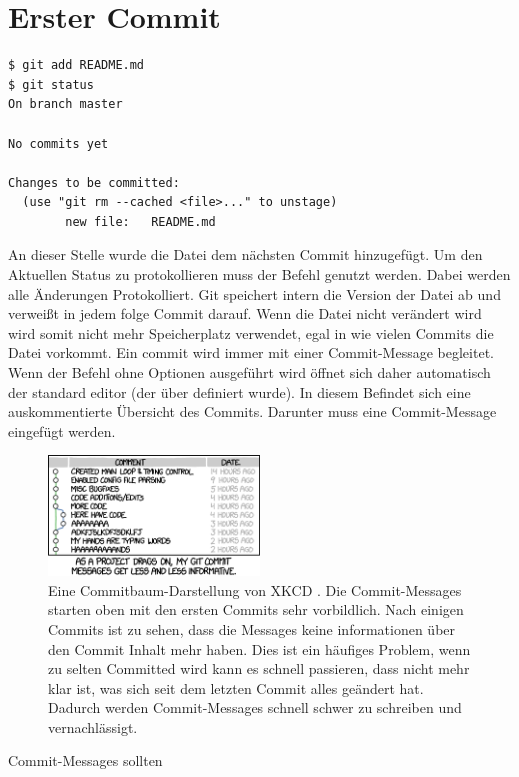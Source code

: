 \section{Erster Commit}
\begin{lstlisting}
$ git add README.md
$ git status
On branch master

No commits yet

Changes to be committed:
  (use "git rm --cached <file>..." to unstage)
        new file:   README.md
\end{lstlisting}
An dieser Stelle wurde die Datei
 dem nächsten Commit hinzugefügt. Um den Aktuellen Status zu protokollieren muss der Befehl  genutzt werden. Dabei werden alle Änderungen Protokolliert.
Git speichert intern die Version der Datei ab und verweißt in jedem folge Commit darauf. Wenn die Datei nicht verändert wird wird somit nicht mehr Speicherplatz verwendet, egal in wie vielen Commits die Datei vorkommt.
Ein commit wird immer mit einer Commit-Message begleitet. Wenn der Befehl  ohne Optionen ausgeführt wird öffnet sich daher automatisch der standard editor (der über  definiert wurde). In diesem Befindet sich eine auskommentierte Übersicht des Commits. Darunter muss eine Commit-Message eingefügt werden.
\begin{figure}[!h]
        \centering
        \includegraphics[width=0.5\textwidth]{Bilder/git_commit.png}
        \caption{Eine Commitbaum-Darstellung von XKCD \cite{Munroe}. Die Commit-Messages starten oben mit den ersten Commits sehr vorbildlich. Nach einigen Commits ist zu sehen, dass die Messages keine informationen über den Commit Inhalt mehr haben. Dies ist ein häufiges Problem, wenn zu selten Committed wird kann es schnell passieren, dass nicht mehr klar ist, was sich seit dem letzten Commit alles geändert hat. Dadurch werden Commit-Messages schnell schwer zu schreiben und vernachlässigt.}
        \label{fig:commit-XKCD}
\end{figure}

Commit-Messages sollten 